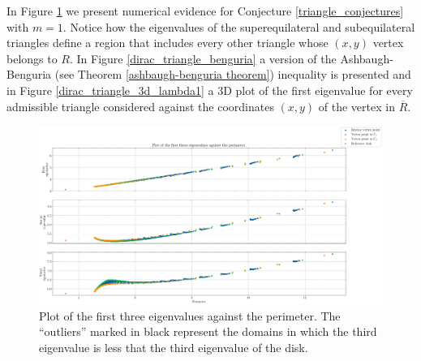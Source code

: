 In Figure \ref{dirac_smooth_first_eigenvalues} we present numerical evidence for Conjecture \ref{triangle_conjectures} with \(m=1\). Notice how the eigenvalues of the superequilateral and subequilateral triangles define a region that includes every other triangle whose \((x, y)\) vertex belongs to \(R\). In Figure \ref{dirac_triangle_benguria} a version of the Ashbaugh-Benguria (see Theorem \ref{ashbaugh-benguria theorem}) inequality is presented and in Figure \ref{dirac_triangle_3d_lambda1} a 3D plot of the first eigenvalue for every admissible triangle considered against the coordinates \((x,y)\) of the vertex in \(\overline{R}\).

\begin{figure}[!htb]
    \centering
    \begin{minipage}[c]{0.8\textwidth}
        \centering
        \includegraphics[width=\textwidth]{Images/Dirac/triangles/triangle_first_eigenvalues.png}
        \caption{Plot of the first three eigenvalues against the perimeter. The ``outliers'' marked in black represent the domains in which the third eigenvalue is less that the third eigenvalue of the disk.}
        \label{dirac_smooth_first_eigenvalues}
    \end{minipage}

    \vspace{0.5cm}


\end{figure}
